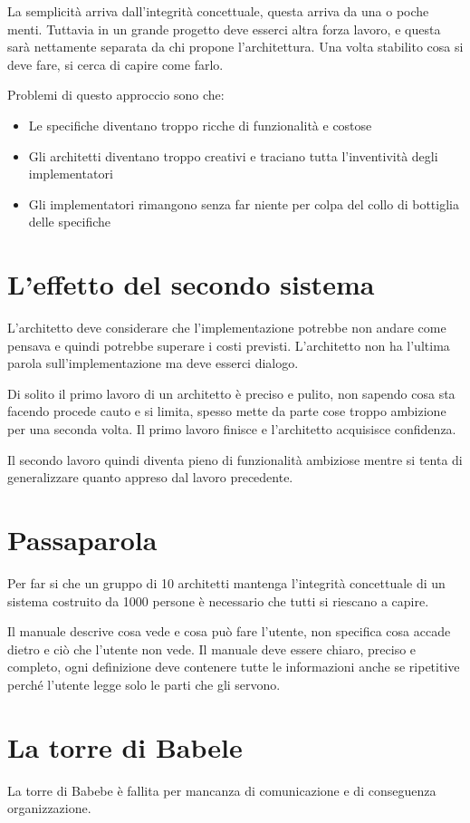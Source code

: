 \documentclass[a4paper,12pt,titlepage,oneside]{book}
\begin{document}
La semplicità arriva dall'integrità concettuale, questa arriva da una o poche menti. Tuttavia in un grande progetto deve esserci altra forza lavoro, e questa sarà nettamente separata da chi propone l'architettura. Una volta stabilito cosa si deve fare, si cerca di capire come farlo.

Problemi di questo approccio sono che:
\begin{itemize}
    \item Le specifiche diventano troppo ricche di funzionalità e costose
    \item Gli architetti diventano troppo creativi e traciano tutta l'inventività degli implementatori
    \item Gli implementatori rimangono senza far niente per colpa del collo di bottiglia delle specifiche
\end{itemize}
\section{L'effetto del secondo sistema}
L'architetto deve considerare che l'implementazione potrebbe non andare come pensava e quindi potrebbe superare i costi previsti. L'architetto non ha l'ultima parola sull'implementazione ma deve esserci dialogo.

Di solito il primo lavoro di un architetto è preciso e pulito, non sapendo cosa sta facendo procede cauto e si limita, spesso mette da parte cose troppo ambizione per una seconda volta. Il primo lavoro finisce e l'architetto acquisisce confidenza.

Il secondo lavoro quindi diventa pieno di funzionalità ambiziose mentre si tenta di generalizzare quanto appreso dal lavoro precedente.

\section{Passaparola}
Per far si che un gruppo di 10 architetti mantenga l'integrità concettuale di un sistema costruito da 1000 persone è necessario che tutti si riescano a capire.

Il manuale descrive cosa vede e cosa può fare l'utente, non specifica cosa accade dietro e ciò che l'utente non vede. Il manuale deve essere chiaro, preciso e completo, ogni definizione deve contenere tutte le informazioni anche se ripetitive perché l'utente legge solo le parti che gli servono.

\section{La torre di Babele}
La torre di Babebe è fallita per mancanza di comunicazione e di conseguenza organizzazione.
\end{document}

